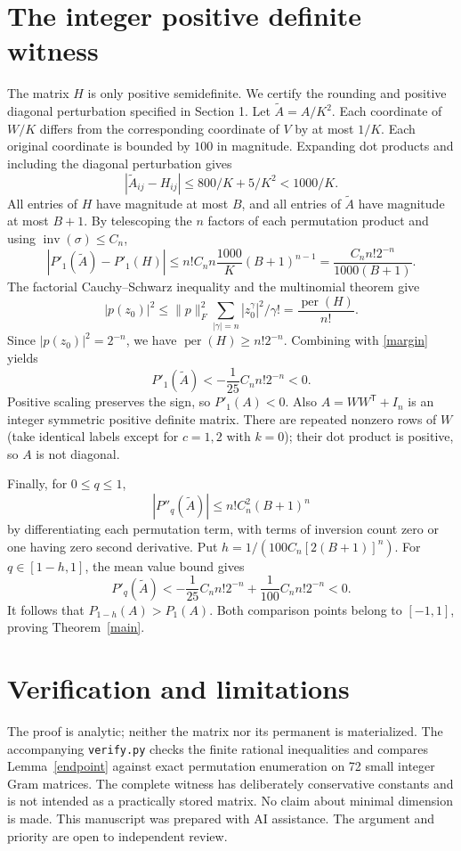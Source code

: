 \documentclass[11pt]{article}
\newcommand{\per}{\operatorname{per}}
\newcommand{\inv}{\operatorname{inv}}
\begin{document}
\section{The integer positive definite witness}
The matrix $H$ is only positive semidefinite. We certify the rounding and positive diagonal perturbation specified in Section 1. Let $\widetilde A=A/K^2$. Each coordinate of $W/K$ differs from the corresponding coordinate of $V$ by at most $1/K$. Each original coordinate is bounded by $100$ in magnitude. Expanding dot products and including the diagonal perturbation gives
\[
 |\widetilde A_{ij}-H_{ij}|\le 800/K+5/K^2<1000/K.
\]
All entries of $H$ have magnitude at most $B$, and all entries of $\widetilde A$ have magnitude at most $B+1$. By telescoping the $n$ factors of each permutation product and using $\inv(\sigma)\le C_n$,
\[
 |P'_1(\widetilde A)-P'_1(H)|\le n!C_n n\frac{1000}{K}(B+1)^{n-1}
 =\frac{C_n n!2^{-n}}{1000(B+1)}.
\]
The factorial Cauchy--Schwarz inequality and the multinomial theorem give
\[
 |p(z_0)|^2\le \|p\|_F^2\sum_{|\gamma|=n}|z_0^\gamma|^2/\gamma!=\frac{\per(H)}{n!}.
\]
Since $|p(z_0)|^2=2^{-n}$, we have $\per(H)\ge n!2^{-n}$. Combining with \eqref{margin} yields
\[
 P'_1(\widetilde A)<-\frac1{25}C_n n!2^{-n}<0.
\]
Positive scaling preserves the sign, so $P'_1(A)<0$. Also $A=WW^{\mathsf T}+I_n$ is an integer symmetric positive definite matrix. There are repeated nonzero rows of $W$ (take identical labels except for $c=1,2$ with $k=0$); their dot product is positive, so $A$ is not diagonal.

Finally, for $0\le q\le1$,
\[
 |P''_q(\widetilde A)|\le n!C_n^2(B+1)^n
\]
by differentiating each permutation term, with terms of inversion count zero or one having zero second derivative. Put $h=1/(100C_n[2(B+1)]^n)$. For $q\in[1-h,1]$, the mean value bound gives
\[
 P'_q(\widetilde A)<-\frac1{25}C_n n!2^{-n}+\frac1{100}C_n n!2^{-n}<0.
\]
It follows that $P_{1-h}(A)>P_1(A)$. Both comparison points belong to $[-1,1]$, proving Theorem~\ref{main}.

\section{Verification and limitations}
The proof is analytic; neither the matrix nor its permanent is materialized. The accompanying \texttt{verify.py} checks the finite rational inequalities and compares Lemma~\ref{endpoint} against exact permutation enumeration on 72 small integer Gram matrices. The complete witness has deliberately conservative constants and is not intended as a practically stored matrix. No claim about minimal dimension is made. This manuscript was prepared with AI assistance. The argument and priority are open to independent review.
\end{document}
